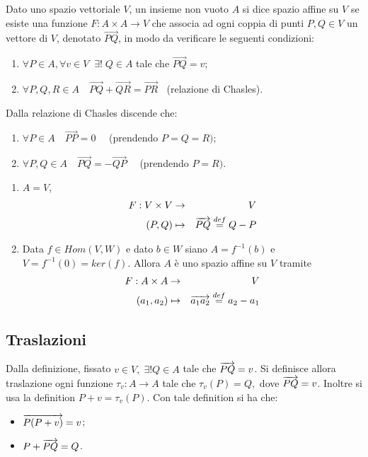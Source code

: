  Dato uno spazio vettoriale $V$, un insieme non vuoto $A$ si dice spazio affine su $V$
 se esiste una funzione $F:A\times A\to V$ che associa ad ogni coppia di punti $P,Q\in V$ un vettore di $V$,
 denotato $\overrightarrow{PQ}$, in modo da verificare le seguenti condizioni:
 \begin{enumerate}[label=\bf\Roman*)]
	\item $\forall P\in A,\forall v\in V\;\;\exists!\; Q\in A$ tale che $\overrightarrow{PQ}=v$;
	\item $\forall P,Q,R\in A\quad\overrightarrow{PQ}+\overrightarrow{QR}=\overrightarrow{PR}\;\;$
		(relazione di Chasles).
 \end{enumerate}
 
 \begin{remark}
 Dalla relazione di Chasles discende che: 
 \begin{enumerate}[label=\bf\alph*)]
	\item $\forall P\in A\quad\overrightarrow{PP}=0\quad$ (prendendo $P=Q=R);$
	\item $\forall P,Q\in A\quad\overrightarrow{PQ}=-\overrightarrow{QP}\quad$ (prendendo $P=R).$
 \end{enumerate}
 \end{remark}
 
 \begin{example}
	\begin{enumerate}[label=\bf\Roman*)]
 \item $A=V$,
 \begin{eqnarray*}
	F: V\times V & \to & V \\
	(P,Q) & \mapsto & \overrightarrow{PQ}\stackrel{def}{=}Q-P
 \end{eqnarray*}
 \item Data $f\in Hom(V,W)$ e dato $b\in W$ siano $A=f^{-1}(b)$ e $V=f^{-1}(0)=ker(f)$.
 Allora $A$ è uno spazio affine su $V$ tramite
 \begin{eqnarray*}
  F: A\times A & \to & V \\
  (a_1,a_2) & \mapsto & \overrightarrow{a_1a_2}\stackrel{def}{=}a_2-a_1
 \end{eqnarray*}
 \end{enumerate}
 \end{example}
 
	\subsection{Traslazioni}
 
 Dalla definizione, fissato $v\in V,\;\exists !Q\in A$ tale che $\overrightarrow{PQ}=v$.
 Si definisce allora traslazione ogni funzione $\tau_v:A\to A$ tale che $\tau_v(P)=Q,$ dove $\overrightarrow{PQ}=v$.
 Inoltre si usa la definition $P+v=\tau_v(P)$.
 Con tale definition si ha che:
 \begin{itemize}
	\item $\overrightarrow{P(P+v)}= {v}$;
	\item $P+\overrightarrow{PQ}=Q$.
 \end{itemize}
 
